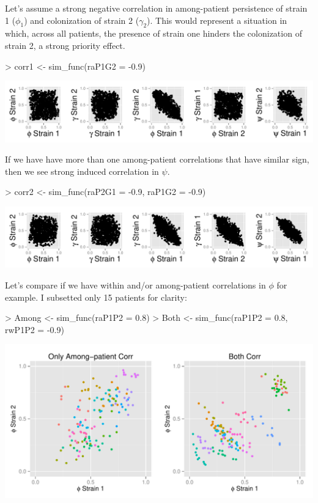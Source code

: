 \documentclass{article}
\begin{document}
Let's assume a strong negative correlation in among-patient persistence of strain 1 ($\phi_1$) and colonization of strain 2 ($\gamma_2$). This would represent a situation in which, across all patients, the presence of strain one hinders the colonization of strain 2, a strong priority effect. 
\begin{Schunk}
\begin{Sinput}
> corr1 <- sim_func(raP1G2 = -0.9)
\end{Sinput}
\end{Schunk}

\begin{center}
\includegraphics{ReadMe-004}
\end{center}

If we have have more than one among-patient correlations that have similar sign, then we see strong induced correlation in $\psi$.

\begin{Schunk}
\begin{Sinput}
> corr2 <- sim_func(raP2G1 = -0.9, raP1G2 = -0.9)
\end{Sinput}
\end{Schunk}

\begin{center}
\includegraphics{ReadMe-006}
\end{center}

Let's compare if we have within and/or among-patient correlations in $\phi$ for example. I subsetted only 15 patients for clarity:

\begin{Schunk}
\begin{Sinput}
> Among <- sim_func(raP1P2 = 0.8)
> Both <- sim_func(raP1P2 = 0.8, rwP1P2 = -0.9)
\end{Sinput}
\end{Schunk}

\begin{center}
\includegraphics{ReadMe-008}
\end{center}
\end{document}
